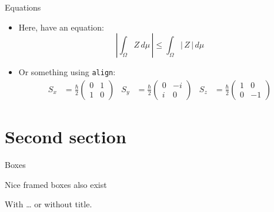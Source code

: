 \documentclass[aspectratio=169]{beamer}    %
\begin{document}
\begin{frame}{Equations}
    \begin{itemize}
        \item Here, have an equation:
            \[
                \left|\int_{\Omega} Z\, d\mu\,\right| 
                \leq \int_{\Omega} |\,Z\,|\, d\mu
            \]
        \item Or something using \texttt{align}:
            \begin{align*}
                S_x &= \frac{\hbar}{2} \begin{pmatrix}
                0 & 1 \\ 1 & 0 \end{pmatrix} &
                S_y &= \frac{\hbar}{2} \begin{pmatrix}
                0 & -i \\ i & 0 \end{pmatrix} &
                S_z &= \frac{\hbar}{2} \begin{pmatrix}
                1 & 0 \\ 0 & -1 \end{pmatrix}
            \end{align*}
    \end{itemize}
\end{frame}


\section{Second section}
\begin{frame}{Boxes}
    \begin{ostbox}{}
        Nice framed boxes also exist
    \end{ostbox}
    \begin{ostbox}{With \dots}
        or without title.
    \end{ostbox}
\end{frame}
\end{document}
